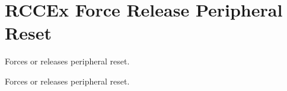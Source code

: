\hypertarget{group___r_c_c_ex___force___release___peripheral___reset}{}\section{R\+C\+C\+Ex Force Release Peripheral Reset}
\label{group___r_c_c_ex___force___release___peripheral___reset}


Forces or releases peripheral reset.  


Forces or releases peripheral reset. 

